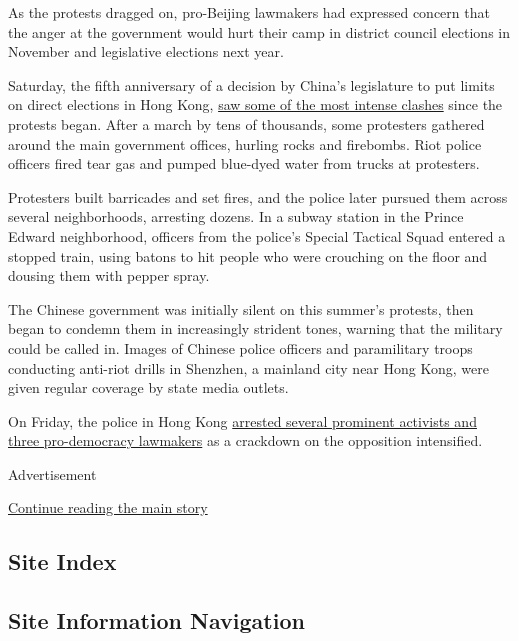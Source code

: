As the protests dragged on, pro-Beijing lawmakers had expressed concern
that the anger at the government would hurt their camp in district
council elections in November and legislative elections next year.

Saturday, the fifth anniversary of a decision by China's legislature to
put limits on direct elections in Hong Kong,
\href{https://www.nytimes3xbfgragh.onion/2019/08/31/world/asia/hong-kong-protest.html}{saw
some of the most intense clashes} since the protests began. After a
march by tens of thousands, some protesters gathered around the main
government offices, hurling rocks and firebombs. Riot police officers
fired tear gas and pumped blue-dyed water from trucks at protesters.

Protesters built barricades and set fires, and the police later pursued
them across several neighborhoods, arresting dozens. In a subway station
in the Prince Edward neighborhood, officers from the police's Special
Tactical Squad entered a stopped train, using batons to hit people who
were crouching on the floor and dousing them with pepper spray.

The Chinese government was initially silent on this summer's protests,
then began to condemn them in increasingly strident tones, warning that
the military could be called in. Images of Chinese police officers and
paramilitary troops conducting anti-riot drills in Shenzhen, a mainland
city near Hong Kong, were given regular coverage by state media outlets.

On Friday, the police in Hong Kong
\href{https://www.nytimes3xbfgragh.onion/2019/08/29/world/asia/joshua-wong-hong-kong.html}{arrested
several prominent activists and three pro-democracy lawmakers} as a
crackdown on the opposition intensified.

Advertisement

\protect\hyperlink{after-bottom}{Continue reading the main story}

\hypertarget{site-index}{%
\subsection{Site Index}\label{site-index}}

\hypertarget{site-information-navigation}{%
\subsection{Site Information
Navigation}\label{site-information-navigation}}

